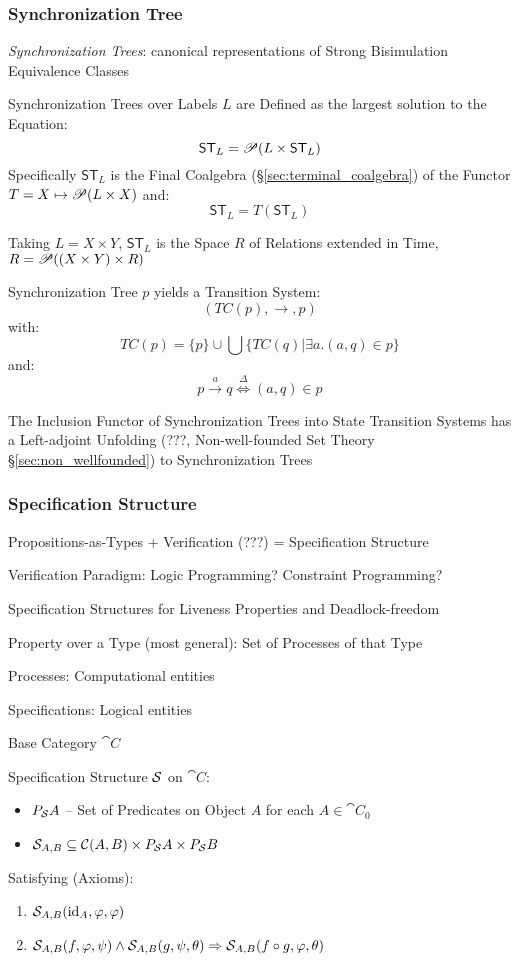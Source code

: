 \subsubsection{Synchronization Tree}\label{sec:synchronization_tree}

\emph{Synchronization Trees}: canonical representations of Strong
Bisimulation Equivalence Classes

Synchronization Trees over Labels $L$ are Defined as the largest
solution to the Equation:
\[
  \mathsf{ST}_L = \mathscr{P}(L \times \mathsf{ST}_L)
\]
Specifically $\mathsf{ST}_L$ is the Final Coalgebra
(\S\ref{sec:terminal_coalgebra}) of the Functor $T = X \mapsto \mathscr{P}(L
\times X)$ and:
\[
  \mathsf{ST}_L = T(\mathsf{ST}_L)
\]

Taking $L = X \times Y$, $\mathsf{ST}_L$ is the Space $R$ of Relations
extended in Time, $R = \mathscr{P}((X \times Y) \times R)$

Synchronization Tree $p$ yields a Transition System:
\[
  (TC(p), \rightarrow, p)
\]
with:
\[
  TC(p) = \{p\} \cup \bigcup\{TC(q) | \exists a.(a,q) \in p\}
\]
and:
\[
  p \xrightarrow{a} q \stackrel{\Delta}\Longleftrightarrow (a,q) \in p
\]

The Inclusion Functor of Synchronization Trees into State Transition
Systems has a Left-adjoint Unfolding (???, Non-well-founded Set Theory
\S\ref{sec:non_wellfounded}) to Synchronization Trees



\subsubsection{Specification Structure}
\label{sec:specification_structure}
\cite{abramsky-gay-nagarajan96}

Propositions-as-Types + Verification (???) = Specification Structure

Verification Paradigm: Logic Programming? Constraint Programming?

Specification Structures for Liveness Properties and Deadlock-freedom

Property over a Type (most general): Set of Processes of that Type

Processes: Computational entities

Specifications: Logical entities

Base Category $\cat{C}$

Specification Structure $\mathcal{S}$ on $\cat{C}$:
\begin{itemize}
  \item $P_{\mathcal{S}} A$ -- Set of Predicates on Object $A$ for each
    $A \in \cat{C}_0$
  \item $\mathcal{S}_{A,B} \subseteq \mathcal{C}(A,B) \times P_{\mathcal{S}}
    A \times P_{\mathcal{S}} B$
\end{itemize}
Satisfying (Axioms):
\begin{enumerate}
  \item $\mathcal{S}_{A,B}(\mathrm{id}_A,\varphi,\varphi)$
  \item $\mathcal{S}_{A,B}(f,\varphi,\psi)
    \wedge \mathcal{S}_{A,B}(g,\psi,\theta)
    \Rightarrow \mathcal{S}_{A,B}(f \circ g, \varphi, \theta)$
\end{enumerate}

